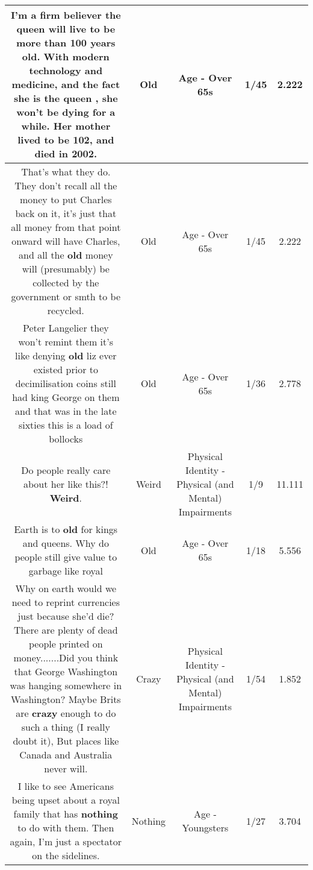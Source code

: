 \documentclass[11pt]{article}
\newlength\mylength
\begin{document}
\begin{center}
\begin{longtable}{|C{.65\mylength}|C{.30\mylength}|C{.12\mylength}|C{.12\mylength}|C{.12\mylength}|}
  \small I'm a firm believer the queen will live to be more than 100 years \textbf{old}. With modern technology and medicine, and the fact she is the queen , she won't be dying for a while. Her mother lived to be 102, and died in 2002.\normalsize   & Old & Age - Over 65s & 1/45 & 2.222 \\  \hline
  \small That's what they do. They don't recall all the money to put Charles back on it, it's just that all money from that point onward will have Charles, and all the \textbf{old} money will (presumably) be collected by the government or smth to be recycled.\normalsize   & Old & Age - Over 65s & 1/45 & 2.222 \\  \hline
  \small Peter Langelier they won't remint them it's like denying \textbf{old} liz ever existed prior to decimilisation coins still had king George on them and that was in the late sixties this is a load of bollocks\normalsize   & Old & Age - Over 65s & 1/36 & 2.778 \\  \hline
  \small Do people really care about her like this?! \textbf{Weird}.\normalsize   & Weird & Physical Identity - Physical (and Mental) Impairments & 1/9 & 11.111 \\  \hline
  \small Earth is to \textbf{old} for kings and queens. Why do people still give value to garbage like royal\normalsize   & Old & Age - Over 65s & 1/18 & 5.556 \\  \hline
  \small Why on earth would we need to reprint currencies just because she'd die? There are plenty of dead people printed on money.......Did you think that George Washington was hanging somewhere in Washington? Maybe Brits are \textbf{crazy} enough to do such a thing (I really doubt it), But places like Canada and Australia never will.\normalsize   & Crazy & Physical Identity - Physical (and Mental) Impairments & 1/54 & 1.852 \\  \hline
  \small I like to see Americans being upset about a royal family that has \textbf{nothing} to do with them. Then again, I'm just a spectator on the sidelines.\normalsize   & Nothing & Age - Youngsters & 1/27 & 3.704 \\  \hline

\end{longtable}
\end{center}
\end{document}

